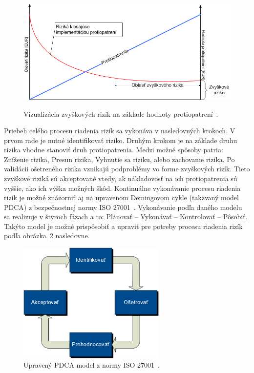 \begin{figure}[H]
\begin{center}\includegraphics[width=\textwidth,height=6cm,keepaspectratio=true]{assets/zvyskove_riziko.png}\end{center}
\caption[Vizualizácia zvyškových rizík na základe hodnoty protiopatrení]{Vizualizácia zvyškových rizík na základe hodnoty protiopatrení~\cite{RiadenieRizik}.}\label{fig:obr_3}
\end{figure}

Priebeh celého procesu riadenia rizík sa vykonáva v nasledovných krokoch.
V prvom rade je nutné identifikovať riziko.
Druhým krokom je na základe druhu rizika vhodne stanoviť druh protiopatrenia.
Medzi možné spôsoby patria: Zníženie rizika, Presun rizika, Vyhnutie sa riziku, alebo zachovanie rizika.
Po validácii ošetreného rizika vznikajú podproblémy vo forme zvyškových rizík.
Tieto zvyškové riziká sú akceptované vtedy, ak nákladovosť na ich protiopatrenia sú vyššie, ako ich výška možných škôd.
Kontinuálne vykonávanie procesu riadenia rizík je možné znázorniť aj na upravenom Demingovom cykle (takzvaný model PDCA) z
bezpečnostnej normy ISO 27001~\cite{ISO27001:2013}.
Vykonávanie podľa daného modelu sa realizuje v štyroch fázach a to: Plánovať – Vykonávať – Kontrolovať – Pôsobiť.
Takýto model je možné prispôsobiť a upraviť pre potreby procesu riadenia rizík podľa obrázka~\ref{fig:obr_4} nasledovne.

\begin{figure}[H]
\begin{center}\includegraphics[width=\textwidth,height=6cm,keepaspectratio=true]{assets/pdca.png}\end{center}
\caption[Upravený PDCA model z normy ISO 27001]{Upravený PDCA model z normy ISO 27001~\cite{RiadenieRizik}.}\label{fig:obr_4}
\end{figure}

